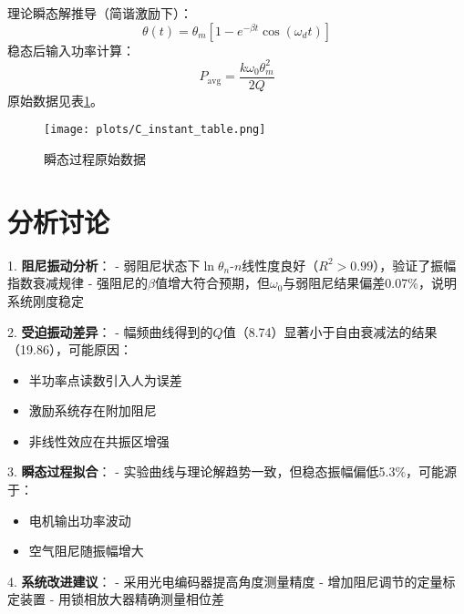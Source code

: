 \documentclass[UTF8]{ctexart}
\begin{document}
理论瞬态解推导（简谐激励下）：
\[
\theta(t) = \theta_m\left[1 - e^{-\beta t}\cos(\omega_d t)\right]
\]
稳态后输入功率计算：
\[
P_{\text{avg}} = \frac{k\omega_0\theta_m^2}{2Q}
\]
原始数据见表\ref{tab:C_instant}。

\begin{figure}[H]
    \centering
    \texttt{[image: plots/C\_instant\_table.png]}
    \caption{瞬态过程原始数据}
    \label{tab:C_instant}
\end{figure}

\section{分析讨论}

1. \textbf{阻尼振动分析}：
   - 弱阻尼状态下$\ln\theta_n$-$n$线性度良好（$R^2>0.99$），验证了振幅指数衰减规律
   - 强阻尼的$\beta$值增大符合预期，但$\omega_0$与弱阻尼结果偏差0.07\%，说明系统刚度稳定

2. \textbf{受迫振动差异}：
   - 幅频曲线得到的$Q$值（8.74）显著小于自由衰减法的结果（19.86），可能原因：
     \begin{itemize}
       \item 半功率点读数引入人为误差
       \item 激励系统存在附加阻尼
       \item 非线性效应在共振区增强
     \end{itemize}

3. \textbf{瞬态过程拟合}：
   - 实验曲线与理论解趋势一致，但稳态振幅偏低5.3\%，可能源于：
     \begin{itemize}
       \item 电机输出功率波动
       \item 空气阻尼随振幅增大
     \end{itemize}

4. \textbf{系统改进建议}：
   - 采用光电编码器提高角度测量精度
   - 增加阻尼调节的定量标定装置
   - 用锁相放大器精确测量相位差
\end{document}
